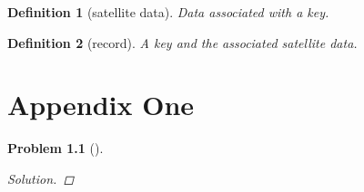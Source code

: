 \documentclass[oneside]{book}
\newtheorem{problem}{Problem}[section]
\newtheorem{definition}{Definition}[chapter]
\begin{document}
\begin{spacing}{1.618}
\begin{definition}[satellite data]
	Data associated with a key. 
\end{definition}

\begin{definition}[record]
	A key and the associated satellite data.
\end{definition}

\appendix
\chapter{Appendix One}

\begin{problem}[]
	\begin{proof}[Solution]

	\end{proof}
\end{problem}

\end{spacing}
\backmatter

\printglossary[type=\acronymtype]
\clearpage

\printglossary
\clearpage

\printbibliography
\clearpage

\printindex
%
\end{document}
